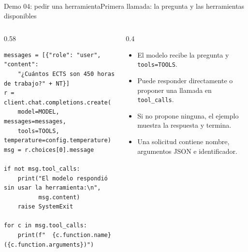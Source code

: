 \begin{frame}[fragile]{Demo 04: pedir una herramienta}{Primera llamada: la pregunta y las herramientas disponibles}
	\begin{columns}[T]
		\begin{column}{0.58\textwidth}
			\begin{lstlisting}
messages = [{"role": "user", "content":
    "¿Cuántos ECTS son 450 horas de trabajo?" + NT}]
r = client.chat.completions.create(
    model=MODEL, messages=messages,
    tools=TOOLS, temperature=config.temperature)
msg = r.choices[0].message

if not msg.tool_calls:
    print("El modelo respondió sin usar la herramienta:\n",
          msg.content)
    raise SystemExit

for c in msg.tool_calls:
    print(f"  {c.function.name}({c.function.arguments})")
\end{lstlisting}
		\end{column}
		\begin{column}{0.4\textwidth}
			\footnotesize
			\begin{itemize}
				\item El modelo recibe la pregunta y \texttt{tools=TOOLS}.
				\item Puede responder directamente o proponer una llamada en \texttt{tool\_calls}.
				\item Si no propone ninguna, el ejemplo muestra la respuesta y termina.
				\item Una solicitud contiene nombre, argumentos JSON e identificador.
			\end{itemize}
		\end{column}
	\end{columns}
\end{frame}

